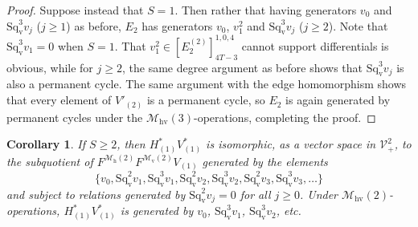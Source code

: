 \documentclass[11pt]{amsart} \renewcommand{\baselinestretch}{1.4}
\theoremstyle{plain}
\newtheorem{cor}[thm]{Corollary}
\theoremstyle{definition}
\newcommand{\calV}{\mathcal{V}}
\newcommand{\calw}{\mathcal{W}}
\newcommand{\calmv}{\mathcal{M}\dver}
\newcommand{\calmh}{\mathcal{M}\dhor}
\newcommand{\calMv}{\mathcal{M}\dver}
\newcommand{\calMh}{\mathcal{M}\dhor}
\newcommand{\calMhv}{\mathcal{M}_\mathrm{hv}}
\newcommand{\vect}[2]{\calV^{#1}_{#2}}
\newcommand{\F}{\mathbb{F}}
\newcommand{\Ftwo}{\F_2}
\newcommand{\E}[5]{[E^{#1}_{#2}#3]^{#4}_{#5}}
\newcommand{\dver}{_\mathrm{v}}
\newcommand{\dhor}{_\mathrm{h}}
\newcommand{\Sqv}{\mathrm{Sq}\dver}
\begin{document}
\begin{Calculations of HWn for n nonzero}
\begin{proof}
Suppose instead that $S=1$. Then rather that having generators $v_0$ and $\Sqv^3v_j$ ($j\geq1$) as before, $E_2$ has generators $v_0$, $v_1^{2}$ and $\Sqv^3v_j$ ($j\geq2$). Note that $\Sqv^{3}v_1=0$ when $S=1$.
That $v_1^2\in\E{(2)}{2}{}{1,0,4}{4T-3}$ cannot support differentials is obvious, while for $j\geq2$, the same degree argument as before shows that $\Sqv^3v_j$ is also a permanent cycle. The same argument with the edge homomorphism shows that every element of $V'_{(2)}$ is a permanent cycle, so $E_2$ is again generated by permanent cycles under the $\calMhv(3)$-operations, completing the proof.
\end{proof}
\begin{cor}
\label{the actual statement of what H1V1 is}
If $S\geq2$, then $H^*_{(1)}V^*_{(1)}$ is isomorphic, as a vector space in $\vect{2}{+}$, to the subquotient of $F^{\calMh(2)}F^{\calMv(2)}V_{(1)}$ generated by the elements
\[\{v_0,\Sqv^2v_{1},\Sqv^3v_{1},\Sqv^2v_{2},\Sqv^3v_{2},\Sqv^2v_{3},\Sqv^3v_{3},\ldots\}\]
and subject to relations generated by $\Sqv^2 v_{j}=0$ for all $j\geq0$. Under $\calMhv(2)$-operations, $H^*_{(1)}V^*_{(1)}$ is generated by $v_0$, $\Sqv^3 v_1$, $\Sqv^3 v_2$, etc.


\end{cor}
\end{Calculations of HWn for n nonzero}
\end{document}
